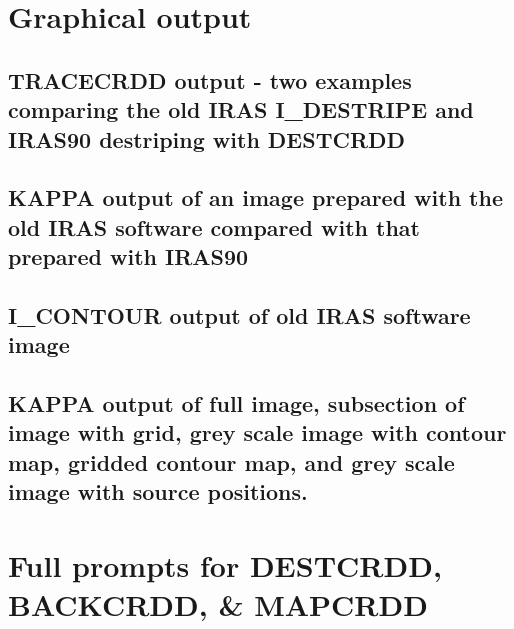 \documentclass[twoside,11pt]{article}
\newenvironment{latexonly}{}{}
\newcommand{\xlabel}[1]{}
\begin{document}
\begin{latexonly}
\section{Graphical output
\xlabel{graphical_output}\label{a:a}}

\subsection{TRACECRDD output - two examples comparing the old IRAS 
I\_DESTRIPE and IRAS90 destriping with DESTCRDD}
\label{a:a1}
\subsection{KAPPA output of an image prepared with the old IRAS software 
compared with that prepared with IRAS90}
\label{a:a2}
\subsection{I\_CONTOUR  output of old IRAS software image}
\label{a:a3}
\subsection{KAPPA output of  full image, subsection of image with grid, grey 
scale image with contour map, gridded contour map, and grey scale image with
source positions.}
\label{a:a4}

%
 
\newpage
\addtocounter{page}{+9}

\end{latexonly}

\newpage

\section{Full prompts for DESTCRDD, BACKCRDD, \& MAPCRDD
\xlabel{full_prompts}\label{a:fulldbm}}
\end{document}
